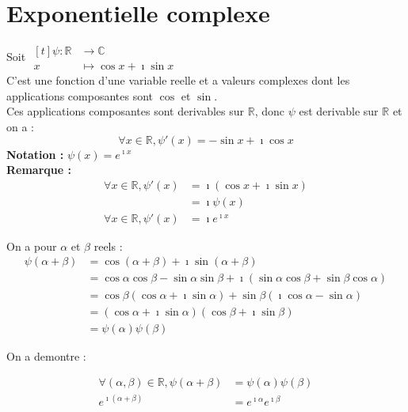\documentclass[12pt,twoside,a4paper]{article}
\begin{document}
	\section{Exponentielle complexe}
		Soit $\begin{aligned}[t]
				\psi\colon\mathbb{R}&\longrightarrow\mathbb{C} \\
						  x&\longmapsto\cos x+\imath\sin x
		      \end{aligned}$ \\
		C'est une fonction d'une variable reelle et a valeurs complexes dont les applications composantes sont $\cos$ et $\sin$. \\
		Ces applications composantes sont derivables sur $\mathbb{R}$, donc $\psi$ est derivable sur $\mathbb{R}$ et on a :
		$$
			\forall x\in\mathbb{R},\psi'\left(x\right)=-\sin x+\imath\cos x
		$$
		\textbf{Notation :} $\psi\left(x\right)=e^{\imath x}$ \\
		\textbf{Remarque :}
		$$\begin{aligned}
			\forall x\in\mathbb{R},\psi'\left(x\right)&=\imath\left(\cos x+\imath\sin x\right)\\
													&=\imath\psi\left(x\right)\\
			\forall x\in\mathbb{R},\psi'\left(x\right)&=\imath e^{\imath x}
		\end{aligned}$$
		\begin{preuve} 
			On a pour $\alpha$ et $\beta$ reels :
			$$\begin{aligned}
				\psi\left(\alpha+\beta\right)&=\cos\left(\alpha+\beta\right)+\imath\sin\left(\alpha+\beta\right) \\
											&=\cos\alpha\cos\beta-\sin\alpha\sin\beta+\imath\left(\sin\alpha\cos\beta+\sin\beta\cos\alpha\right) \\
											&=\cos\beta\left(\cos\alpha+\imath\sin\alpha\right)+\sin\beta\left(\imath\cos\alpha-\sin\alpha\right) \\
											&=\left(\cos\alpha+\imath\sin\alpha\right)\left(\cos\beta+\imath\sin\beta\right) \\
											&=\psi\left(\alpha\right)\psi\left(\beta\right)
			\end{aligned}$$
		\end{preuve}\newpage
		On a demontre :
		\begin{prop}
			$$\begin{aligned}
				\forall\left(\alpha, \beta\right)\in\mathbb{R},\psi\left(\alpha+\beta\right)&=\psi\left(\alpha\right)\psi\left(\beta\right) \\
														 e^{\imath\left(\alpha+\beta\right)}&=e^{\imath\alpha}e^{\imath\beta}
			\end{aligned}$$
		\end{prop}
\end{document}
